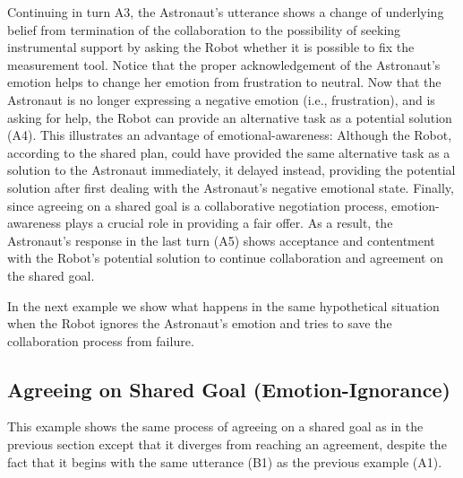 Continuing in turn A3, the Astronaut's utterance shows a change of underlying
belief from termination of the collaboration to the possibility of seeking
instrumental support by asking the Robot whether it is possible to fix the
measurement tool. Notice that the proper acknowledgement of the Astronaut's
emotion helps to change her emotion from frustration to neutral. Now that the
Astronaut is no longer expressing a negative emotion (i.e., frustration), and
is asking for help, the Robot can provide an alternative task as a potential
solution (A4). This illustrates an advantage of emotional-awareness: Although
the Robot, according to the shared plan, could have provided the same
alternative task as a solution to the Astronaut immediately, it delayed instead,
providing the potential solution after first dealing with the Astronaut's
negative emotional state. Finally, since agreeing on a shared goal is a
collaborative negotiation process, emotion-awareness plays a crucial role in
providing a fair offer. As a result, the Astronaut's response in the last turn
(A5) shows acceptance and contentment with the Robot's potential solution to
continue collaboration and agreement on the shared goal.

In the next example we show what happens in the same hypothetical situation when
the Robot ignores the Astronaut's emotion and tries to save the collaboration
process from failure.

\subsection{Agreeing on Shared Goal (Emotion-Ignorance)}
\label{sec:exp2}

This example shows the same process of agreeing on a shared goal as in the
previous section except that it diverges from reaching an agreement, despite the
fact that it begins with the same utterance (B1) as the previous example (A1). 

